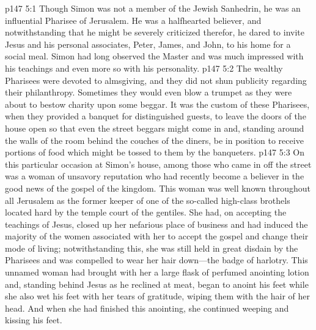 \vs p147 5:1 Though Simon was not a member of the Jewish Sanhedrin, he was an influential Pharisee of Jerusalem. He was a halfhearted believer, and notwithstanding that he might be severely criticized therefor, he dared to invite Jesus and his personal associates, Peter, James, and John, to his home for a social meal. Simon had long observed the Master and was much impressed with his teachings and even more so with his personality.
\vs p147 5:2 The wealthy Pharisees were devoted to almsgiving, and they did not shun publicity regarding their philanthropy. Sometimes they would even blow a trumpet as they were about to bestow charity upon some beggar. It was the custom of these Pharisees, when they provided a banquet for distinguished guests, to leave the doors of the house open so that even the street beggars might come in and, standing around the walls of the room behind the couches of the diners, be in position to receive portions of food which might be tossed to them by the banqueters.
\vs p147 5:3 On this particular occasion at Simon’s house, among those who came in off the street was a woman of unsavory reputation who had recently become a believer in the good news of the gospel of the kingdom. This woman was well known throughout all Jerusalem as the former keeper of one of the so\hyp{}called high\hyp{}class brothels located hard by the temple court of the gentiles. She had, on accepting the teachings of Jesus, closed up her nefarious place of business and had induced the majority of the women associated with her to accept the gospel and change their mode of living; notwithstanding this, she was still held in great disdain by the Pharisees and was compelled to wear her hair down---the badge of harlotry. This unnamed woman had brought with her a large flask of perfumed anointing lotion and, standing behind Jesus as he reclined at meat, began to anoint his feet while she also wet his feet with her tears of gratitude, wiping them with the hair of her head. And when she had finished this anointing, she continued weeping and kissing his feet.
